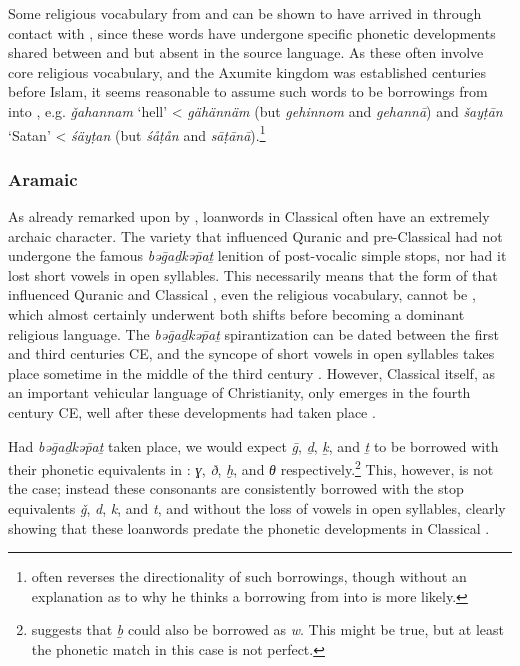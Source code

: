 \documentclass[output=paper]{langsci/langscibook}
\begin{document}
Some religious vocabulary from  and  can be shown to have arrived in  through contact with , since these words have undergone specific phonetic developments shared between  and  but absent in the {source language}. As these often involve core religious vocabulary, and the  Axumite kingdom was established centuries before Islam, it seems reasonable to assume such words to be borrowings from  into , e.g.  \textit{ǧahannam} ‘hell’ <  \textit{gähännäm} (but  \textit{gehinnom} and  \textit{gehannā}) and  \textit{šayṭān} ‘Satan’ <  \textit{śäyṭan} (but  \textit{śåṭån} and  \textit{sāṭānā}).\footnote{\citet{Leslau1990} often reverses the directionality of such borrowings, though without an explanation as to why he thinks a borrowing from  into  is more likely.}

\subsubsection{\label{bkm:Ref13224460}Aramaic}

As already remarked upon by \citet{Retsö2011},  {loanwords} in Classical  often have an extremely archaic character. The  variety that influenced Quranic and pre-Classical  had not undergone the famous \textit{bəḡaḏkəp̄aṯ} lenition of post-vocalic simple stops, nor had it lost short vowels in open syllables. This necessarily means that the form of  that influenced Quranic and Classical , even the religious vocabulary, cannot be , which almost certainly underwent both shifts before becoming a dominant religious language. The \textit{bəḡaḏkəp̄aṯ} spirantization can be dated between the first and third centuries CE, and the syncope of short vowels in open syllables takes place sometime in the middle of the third century \citep[41--42]{Gzella2015}. However, Classical  itself, as an important vehicular language of Christianity, only emerges in the fourth century CE, well after these developments had taken place \citep[259]{Gzella2015}.

Had \textit{bəḡaḏkəp̄aṯ} taken place, we would expect  \textit{ḡ}, \textit{ḏ}, \textit{ḵ}, and \textit{ṯ} to be borrowed with their phonetic equivalents in : \textit{ɣ}, \textit{ð}, \textit{ḫ}, and \textit{θ} respectively.\footnote{\cite{Retsö2011} suggests that \textit{ḇ} could also be borrowed as \textit{w}. This might be true, but at least the phonetic match in this case is not perfect.} This, however, is not the case; instead these consonants are consistently borrowed with the stop equivalents \textit{ǧ}, \textit{d}, \textit{k}, and \textit{t}, and without the loss of vowels in open syllables, clearly showing that these  {loanwords} predate the phonetic developments in Classical .
\end{document}
